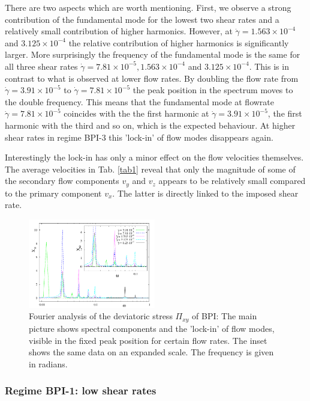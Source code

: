 \documentclass[aps,pre,reprint,superscriptaddress, twocolumn]{revtex4}
\newcommand{\e}[1]{\times10^{#1}}
\newcommand{\gd}{\dot{\gamma}}
\begin{document}
There are two aspects which are worth mentioning. First, we observe a strong contribution of 
the fundamental mode for the lowest two shear rates and a relatively small contribution of higher harmonics. 
However, at $\gd=1.563\e{-4}$ and $3.125\e{-4}$ the relative contribution of higher harmonics is 
significantly larger. 
More surprisingly the frequency of the fundamental mode is the same 
for all three shear rates $\gd=7.81\e{-5}, 1.563\e{-4}$ and $3.125\e{-4}$. This is 
in contrast to what is observed at lower flow rates. By doubling the flow rate from 
$\gd=3.91\e{-5}$ to $\gd=7.81\e{-5}$ the peak position in the spectrum 
moves to the double frequency. This means that the fundamental mode at flowrate $\gd=7.81\e{-5}$ 
coincides with the the first harmonic at $\gd=3.91\e{-5}$, the first harmonic with the third and so on,
which is the expected behaviour. At higher shear rates in regime BPI-3 this 'lock-in' of 
flow modes disappears again.  
 
Interestingly the lock-in has only a minor effect on the flow velocities themselves.
The average velocities in Tab. \ref{tab1} reveal that only the magnitude of some of the secondary 
flow components $v_y$ and $v_z$ appears to be relatively small compared to the primary component $v_x$. 
The latter is directly linked to the imposed shear rate. 

\begin{figure}[htpb]
\includegraphics[width=0.495\textwidth]{spectrum_bp1.pdf}
\caption{Fourier analysis of the deviatoric stress $\Pi_{xy}$ of BPI: The main picture shows 
spectral components and the 'lock-in' of flow modes, 
visible in the fixed peak position for certain flow rates.  
The inset shows the same data on an expanded scale. 
The frequency is given in radians.}
\label{bp1-spectrum}
\end{figure}

\subsubsection{Regime BPI-1: low shear rates}
\end{document}
